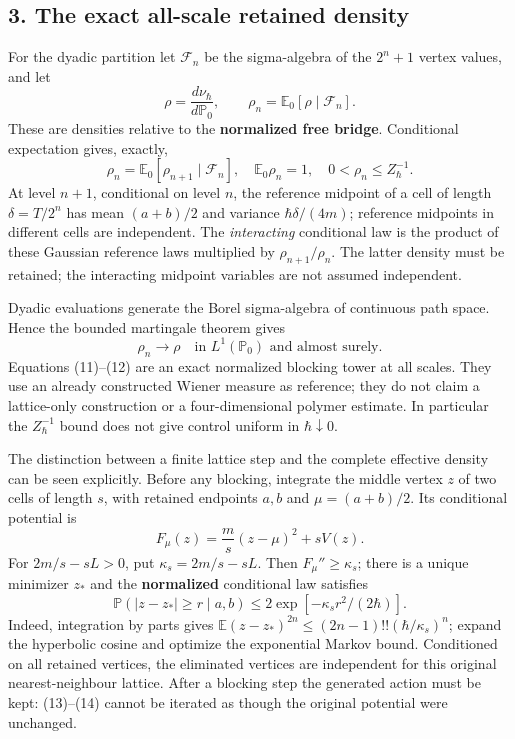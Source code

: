 \documentclass[11pt,a4paper]{article}
\begin{document}
\hypertarget{the-exact-all-scale-retained-density}{%
\subsection{3. The exact all-scale retained
density}\label{the-exact-all-scale-retained-density}}

For the dyadic partition let \(\mathcal F_n\) be the sigma-algebra of
the \(2^n+1\) vertex values, and let
\[\rho=\frac{d\nu_\hbar}{d\mathbb P_0},\qquad
 \rho_n=\mathbb E_0[\rho\mid\mathcal F_n].\tag{10}\] These are densities
relative to the \textbf{normalized free bridge}. Conditional expectation
gives, exactly, \[\rho_n=\mathbb E_0[\rho_{n+1}\mid\mathcal F_n],\quad
 \mathbb E_0\rho_n=1,\quad 0<\rho_n\le Z_\hbar^{-1}.\tag{11}\] At level
\(n+1\), conditional on level \(n\), the reference midpoint of a cell of
length \(\delta=T/2^n\) has mean \((a+b)/2\) and variance
\(\hbar\delta/(4m)\); reference midpoints in different cells are
independent. The \emph{interacting} conditional law is the product of
these Gaussian reference laws multiplied by \(\rho_{n+1}/\rho_n\). The
latter density must be retained; the interacting midpoint variables are
not assumed independent.

Dyadic evaluations generate the Borel sigma-algebra of continuous path
space. Hence the bounded martingale theorem gives
\[\rho_n\longrightarrow\rho\quad\text{in }L^1(\mathbb P_0)
 \text{ and almost surely.}\tag{12}\] Equations (11)--(12) are an exact
normalized blocking tower at all scales. They use an already constructed
Wiener measure as reference; they do not claim a lattice-only
construction or a four-dimensional polymer estimate. In particular the
\(Z_\hbar^{-1}\) bound does not give control uniform in
\(\hbar\downarrow0\).

The distinction between a finite lattice step and the complete effective
density can be seen explicitly. Before any blocking, integrate the
middle vertex \(z\) of two cells of length \(s\), with retained
endpoints \(a,b\) and \(\mu=(a+b)/2\). Its conditional potential is
\[F_\mu(z)=\frac m s(z-\mu)^2+sV(z).\tag{13}\] For \(2m/s-sL>0\), put
\(\kappa_s=2m/s-sL\). Then \(F_\mu''\ge\kappa_s\); there is a unique
minimizer \(z_*\) and the \textbf{normalized} conditional law satisfies
\[\mathbb P(|z-z_*|\ge r\mid a,b)
 \le 2\exp[-\kappa_s r^2/(2\hbar)].\tag{14}\] Indeed, integration by
parts gives \(\mathbb E(z-z_*)^{2n}\le(2n-1)!!(\hbar/\kappa_s)^n\);
expand the hyperbolic cosine and optimize the exponential Markov bound.
Conditioned on all retained vertices, the eliminated vertices are
independent for this original nearest-neighbour lattice. After a
blocking step the generated action must be kept: (13)--(14) cannot be
iterated as though the original potential were unchanged.
\end{document}

